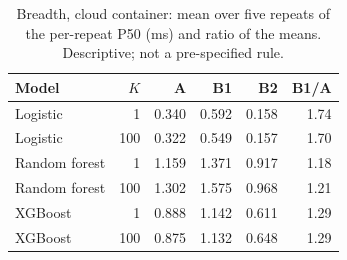 \documentclass[10pt,a4paper]{article}
\begin{document}
\begin{table}[h]
\centering\small
\caption{Breadth, cloud container: mean over five repeats of the per-repeat P50 (ms) and ratio of the means. Descriptive; not a pre-specified rule.}\label{tab:cloud_p50}
\begin{tabular}{lrrrrr}
\toprule
Model & $K$ & A & B1 & B2 & B1/A \\
\midrule
Logistic & 1 & 0.340 & 0.592 & 0.158 & 1.74 \\
Logistic & 100 & 0.322 & 0.549 & 0.157 & 1.70 \\
Random forest & 1 & 1.159 & 1.371 & 0.917 & 1.18 \\
Random forest & 100 & 1.302 & 1.575 & 0.968 & 1.21 \\
XGBoost & 1 & 0.888 & 1.142 & 0.611 & 1.29 \\
XGBoost & 100 & 0.875 & 1.132 & 0.648 & 1.29 \\
\bottomrule
\end{tabular}
\end{table}
\end{document}
